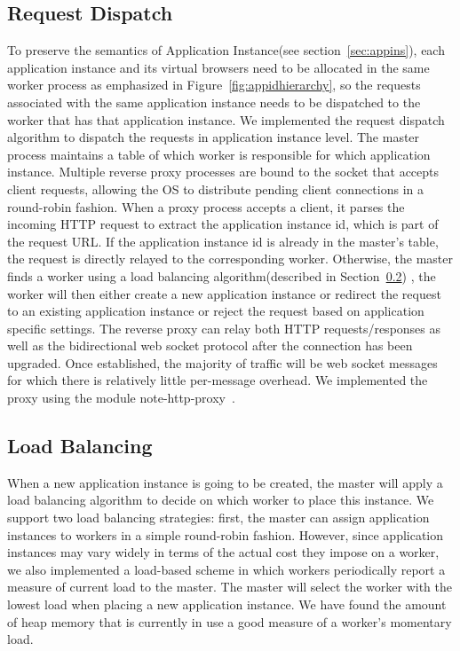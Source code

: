 \subsection{Request Dispatch}
To preserve the semantics of 
Application Instance(see section~\ref{sec:appins}),
each application instance and its virtual browsers need to be allocated in
the same worker process as emphasized in Figure~\ref{fig:appidhierarchy},
so the requests associated with the same application instance needs
to be dispatched to the worker that has that application instance.
We implemented the request dispatch algorithm 
to dispatch the requests in application instance level.
The master process maintains a 
table of which worker is responsible for which application instance.
Multiple reverse proxy processes are bound to the socket that accepts client requests, allowing
the OS to distribute pending client connections in a round-robin fashion.  
When a proxy process accepts a client, it parses the incoming HTTP request 
to extract the application instance id, which is part of the request URL.  
If the application instance id is already in the master's table, the request is directly
relayed to the corresponding worker.  
Otherwise, the master finds a worker using a load balancing algorithm(described in Section~\ref{sec:lb})
, the worker will then either create a new application instance 
or redirect the request to an existing application instance
or reject the request based on application specific settings.  
The reverse proxy can 
relay both HTTP requests/responses as well as the bidirectional web socket protocol after the
connection has been upgraded.  Once established, the majority of traffic will be web socket
messages for which there is relatively little per-message overhead.  We implemented the proxy 
using the \nodejs{} module note-http-proxy~\cite{nodeproxy}.


\subsection{Load Balancing}
\label{sec:lb}
When a new application instance is going to be created,
the master will apply a load balancing algorithm to decide on which worker to place this instance.  
We support two load balancing strategies: first, the master can assign application instances
to workers in a simple round-robin fashion.  
However, since application instances may vary
widely in terms of the actual cost they impose on a worker, we also implemented a load-based
scheme in which workers periodically report a measure of current load to the master.
The master will select the worker with the lowest load when placing a new application instance.
We have found the amount of heap memory that is currently in use a good measure of a worker's 
momentary load.

